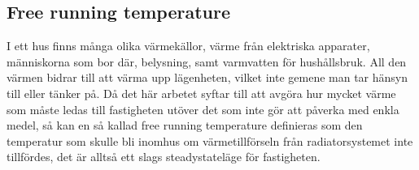\subsection{Free running temperature}
I ett hus finns många olika värmekällor, värme från elektriska apparater, människorna som bor där, belysning, samt varmvatten för hushållsbruk. All den värmen bidrar till att värma upp lägenheten, vilket inte gemene man tar hänsyn till eller tänker på. Då det här arbetet syftar till att avgöra hur mycket värme som måste ledas till fastigheten utöver det som inte gör att påverka med enkla medel, så kan en så kallad free running temperature definieras som den temperatur som skulle bli inomhus om värmetillförseln från radiatorsystemet inte tillfördes, det är alltså ett slags steadystateläge för fastigheten.

